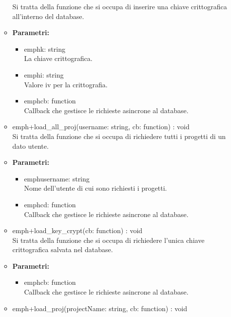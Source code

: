 \begin{itemize}
\begin{itemize}
            Si tratta della funzione che si occupa di inserire una chiave crittografica all'interno del database.
            \item \textbf{Parametri: }\\
            \begin{itemize}
              \item emph{k: string}\\
              La chiave crittografica.
              \item emph{i: string}\\
              Valore iv per la crittografia.
              \item emph{cb: function}\\
              Callback che gestisce le richieste asincrone al database.
            \end{itemize}
            \item emph{+load_all_proj(username: string, cb: function) : void}\\
            Si tratta della funzione che si occupa di richiedere tutti i progetti di un dato utente.
            \item \textbf{Parametri: }\\
            \begin{itemize}
              \item emph{username: string}\\
              Nome dell'utente di cui sono richiesti i progetti.
              \item emph{cd: function}\\
              Callback che gestisce le richieste asincrone al database.
            \end{itemize}
            \item emph{+load_key_crypt(cb: function) : void}\\
            Si tratta della funzione che si occupa di richiedere l'unica chiave crittografica salvata nel database.
            \item \textbf{Parametri: }\\
            \begin{itemize}
              \item emph{cb: function}\\
              Callback che gestisce le richieste asincrone al database.
            \end{itemize}
            \item emph{+load_proj(projectName: string, cb: function) : void }\\

\end{itemize}
\end{itemize}
